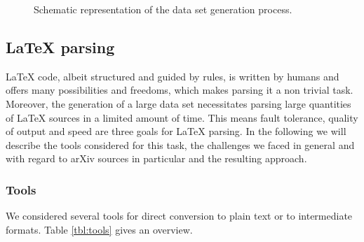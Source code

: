 \begin{figure}[t]
\begin{centering}
    \caption[Schematic representation of the data set generation process.]{Schematic representation of the data set generation process.}
  \label{fig:datagen}
\end{centering}
\end{figure}

\subsection{LaTeX parsing}
LaTeX code, albeit structured and guided by rules, is written by humans and offers many possibilities and freedoms, which makes parsing it a non trivial task. Moreover, the generation of a large data set necessitates parsing large quantities of LaTeX sources in a limited amount of time. This means fault tolerance, quality of output and speed are three goals for LaTeX parsing. In the following we will describe the tools considered for this task, the challenges we faced in general and with regard to arXiv sources in particular and the resulting approach.
\subsubsection{Tools}
We considered several tools for direct conversion to plain text or to intermediate formats. Table \ref{tbl:tools} gives an overview.

